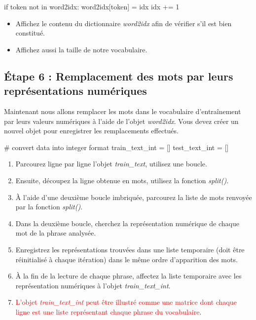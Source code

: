 \begin{python}
	if token not in word2idx:
	 word2idx[token] = idx
	 idx += 1
\end{python}

\begin{itemize}
	\item Affichez le contenu du dictionnaire \textit{word2idx} afin de vérifier s'il est bien constitué.
	\item Affichez aussi la taille de notre vocabulaire.
\end{itemize}

\subsection{Étape 6 : Remplacement des mots par leurs représentations numériques}

Maintenant nous allons remplacer les mots dans le vocabulaire d'entraînement par leurs valeurs numériques à l'aide de l'objet \textit{word2idx}. Vous devez créer un nouvel objet pour enregistrer les remplacements effectués.

\begin{python}
	# convert data into integer format
	train_text_int = []
	test_text_int = []
	
\end{python}
\begin{enumerate}
	\item Parcourez ligne par ligne l'objet \textit{train\_text}, utilisez une boucle.
	\item Ensuite, découpez la ligne obtenue en mots, utilisez la fonction \textit{split()}.
	\item À l'aide d'une deuxième boucle imbriquée, parcourez la liste de mots renvoyée par la fonction \textit{split()}.
	\item Dans la deuxième boucle, cherchez la représentation numérique de chaque mot de la phrase analysée.
	\item Enregistrez les représentations trouvées dans une liste temporaire (doit être réinitialisé à chaque itération) dans le même ordre d'apparition des mots.
	\item À la fin de la lecture de chaque phrase, affectez la liste temporaire avec les représentation numériques à l'objet \textit{train\_text\_int}.
	\item \textcolor{red}{L'objet \textit{train\_text\_int} peut être illustré comme une matrice dont chaque ligne est une liste représentant chaque phrase du vocabulaire}.
\end{enumerate}  

